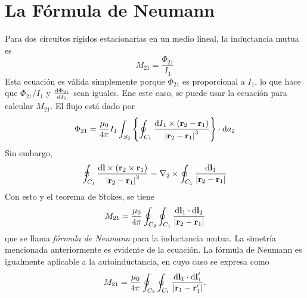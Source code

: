 \section{La Fórmula de Neumann}
Para dos circuitos rígidos estacionarias en un medio lineal, la inductancia mutua es
\begin{equation}
    M_{21} = \frac{\Phi _{21}}{I_1}
\end{equation}
Esta ecuación es válida simplemente porque $\Phi _{21}$ es proporcional a $I_1$, lo que hace que $\Phi _{21} /I_1$ y $\dv{\Phi _{21}}{I_1}$ sean iguales. Ene este caso, se puede usar la ecuación para calcular $M_{21}$. El flujo está dado por
\begin{equation}
    \Phi _{21} = \frac{\mu_0}{4\pi} I_1 \int _{S_2} \left\{ \oint _{C_1} \frac{\dd{I_1} \times (\vb{r} _2 - \vb{r}_1)}{\abs{\vb{r} _2 - \vb{r}_1}^3} \right\} \cdot \dd{a}_2
\end{equation}
Sin embargo,
\begin{equation}
    \oint _{C_1} \frac{\dd{\vb{l}} \times (\vb{r}_2 \times \vb{r}_1)}{\abs{\vb{r}_2 - \vb{r}_1}^3} = \nabla _2 \times \oint _{C_1} \frac{\dd{\vb{l}}_1}{\abs{\vb{r}_2 - \vb{r}_1}}
\end{equation}
Con esto y el teorema de Stokes, se tiene
\begin{equation}
    M_{21} = \frac{\mu_0}{4\pi} \oint _{C_2} \oint _{C_1} \frac{\dd{\vb{l}}_1 \cdot \dd{\vb{l}}_2}{\abs{\vb{r}_2 - \vb{r}_1}}
\end{equation}
que se llama \textit{fórmula de Neumann} para la inductancia mutua. La simetría mencionada anteriormente es evidente de la ecuación. La fórmula de Neumann es igualmente aplicable a la autoinductancia, en cuyo caso se expresa como
\begin{equation}
    M_{21} = \frac{\mu_0}{4\pi} \oint _{C_2} \oint _{C_1} \frac{\dd{\vb{l}}_1 \cdot \dd{\vb{l}}_1 ^\prime}{\abs{\vb{r}_1 - \vb{r}_1 ^\prime}}.
\end{equation}

